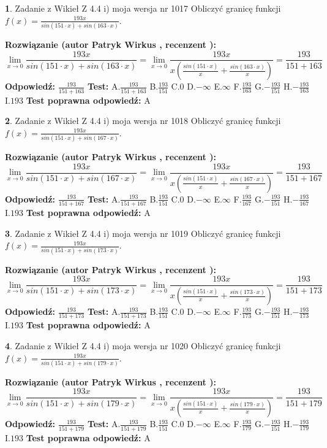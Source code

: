 \documentclass[12pt, a4paper]{article}
\theoremstyle{definition} %
\newtheorem{zad}{}
\newcommand{\zadStart}[1]{\begin{zad}#1\newline}
\newcommand{\zadStop}{\end{zad}}
\newcommand{\rozwStart}[2]{\noindent \textbf{Rozwiązanie (autor #1 , recenzent #2): }\newline}
\newcommand{\rozwStop}{\newline}
\newcommand{\odpStart}{\noindent \textbf{Odpowiedź:}\newline}
\newcommand{\odpStop}{\newline}
\newcommand{\testStart}{\noindent \textbf{Test:}\newline}
\newcommand{\testStop}{\newline}
\newcommand{\kluczStart}{\noindent \textbf{Test poprawna odpowiedź:}\newline}
\newcommand{\kluczStop}{\newline}
\begin{document}
\zadStart{Zadanie z Wikieł Z 4.4 i) moja wersja nr 1017}
Obliczyć granicę funkcji $f(x)=\frac{193x}{sin(151\cdot x) +sin(163\cdot x)}$.
\zadStop
\rozwStart{Patryk Wirkus}{}
$$\lim\limits_{x\to 0}\frac{193x}{sin(151\cdot x) +sin(163\cdot x)}=\lim\limits_{x\to 0}\frac{193x}{x(\frac{sin(151\cdot x)}{x}+\frac{sin(163\cdot x)}{x})}=\frac{193}{151+163}$$
\rozwStop
\odpStart
$\frac{193}{151+163}$
\odpStop
\testStart
A.$\frac{193}{151+163}$
B.$\frac{193}{151}$
C.$0$
D.$-\infty$
E.$\infty$
F.$\frac{193}{163}$
G.$-\frac{193}{151}$
H.$-\frac{193}{163}$
I.$193$
\testStop
\kluczStart
A
\kluczStop



\zadStart{Zadanie z Wikieł Z 4.4 i) moja wersja nr 1018}
Obliczyć granicę funkcji $f(x)=\frac{193x}{sin(151\cdot x) +sin(167\cdot x)}$.
\zadStop
\rozwStart{Patryk Wirkus}{}
$$\lim\limits_{x\to 0}\frac{193x}{sin(151\cdot x) +sin(167\cdot x)}=\lim\limits_{x\to 0}\frac{193x}{x(\frac{sin(151\cdot x)}{x}+\frac{sin(167\cdot x)}{x})}=\frac{193}{151+167}$$
\rozwStop
\odpStart
$\frac{193}{151+167}$
\odpStop
\testStart
A.$\frac{193}{151+167}$
B.$\frac{193}{151}$
C.$0$
D.$-\infty$
E.$\infty$
F.$\frac{193}{167}$
G.$-\frac{193}{151}$
H.$-\frac{193}{167}$
I.$193$
\testStop
\kluczStart
A
\kluczStop



\zadStart{Zadanie z Wikieł Z 4.4 i) moja wersja nr 1019}
Obliczyć granicę funkcji $f(x)=\frac{193x}{sin(151\cdot x) +sin(173\cdot x)}$.
\zadStop
\rozwStart{Patryk Wirkus}{}
$$\lim\limits_{x\to 0}\frac{193x}{sin(151\cdot x) +sin(173\cdot x)}=\lim\limits_{x\to 0}\frac{193x}{x(\frac{sin(151\cdot x)}{x}+\frac{sin(173\cdot x)}{x})}=\frac{193}{151+173}$$
\rozwStop
\odpStart
$\frac{193}{151+173}$
\odpStop
\testStart
A.$\frac{193}{151+173}$
B.$\frac{193}{151}$
C.$0$
D.$-\infty$
E.$\infty$
F.$\frac{193}{173}$
G.$-\frac{193}{151}$
H.$-\frac{193}{173}$
I.$193$
\testStop
\kluczStart
A
\kluczStop



\zadStart{Zadanie z Wikieł Z 4.4 i) moja wersja nr 1020}
Obliczyć granicę funkcji $f(x)=\frac{193x}{sin(151\cdot x) +sin(179\cdot x)}$.
\zadStop
\rozwStart{Patryk Wirkus}{}
$$\lim\limits_{x\to 0}\frac{193x}{sin(151\cdot x) +sin(179\cdot x)}=\lim\limits_{x\to 0}\frac{193x}{x(\frac{sin(151\cdot x)}{x}+\frac{sin(179\cdot x)}{x})}=\frac{193}{151+179}$$
\rozwStop
\odpStart
$\frac{193}{151+179}$
\odpStop
\testStart
A.$\frac{193}{151+179}$
B.$\frac{193}{151}$
C.$0$
D.$-\infty$
E.$\infty$
F.$\frac{193}{179}$
G.$-\frac{193}{151}$
H.$-\frac{193}{179}$
I.$193$
\testStop
\kluczStart
A
\kluczStop
\end{document}
